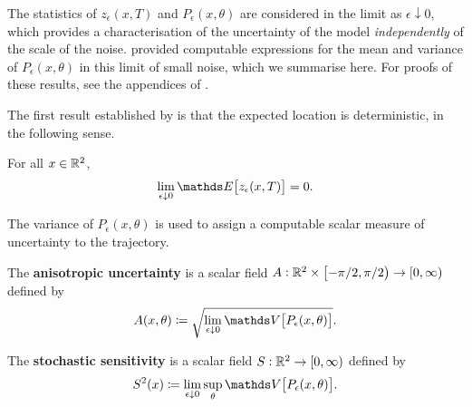 

The statistics of \(z_\epsilon\left(x,T\right)\) and \(P_\epsilon(x,\theta)\) are considered in the limit as \(\epsilon\downarrow 0\), which provides a characterisation of the uncertainty of the model \emph{independently} of the scale of the noise.
\citet{Balasuriya_2020_StochasticSensitivityComputable} provided computable expressions for the mean and variance of \(P_\epsilon\left(x,\theta\right)\) in this limit of small noise, which we summarise here.
For proofs of these results, see the appendices of \cite{Balasuriya_2020_StochasticSensitivityComputable}.

The first result established by \citet{Balasuriya_2020_StochasticSensitivityComputable} is that the expected location is deterministic, in the following sense.
\begin{theorem}
	For all \(x \in \mathbb{R}^2\),
	\[
		\lim_{\epsilon\downarrow 0}\avg{z_\epsilon(x,T)} = 0.
	\]
\end{theorem}

The variance of \(P_\epsilon\left(x,\theta\right)\) is used to assign a computable scalar measure of uncertainty to the trajectory.

\begin{definition}
	\begin{alpharate}
		\item The \textbf{anisotropic uncertainty} is a scalar field \(A: \mathbb{R}^2\times\left[-\pi/2, \pi/2\right) \to [0,\infty)\) defined by
		\[
			A(x,\theta) \coloneqq \sqrt{\lim_{\epsilon\downarrow 0}\var{P_\epsilon(x,\theta)}}.
		\]

		\item The \textbf{stochastic sensitivity} is a scalar field \(S: \mathbb{R}^2 \to [0,\infty)\) defined by
		\[
			S^2(x) \coloneqq \lim_{\epsilon\downarrow 0}\sup_{\theta}{\var{P_\epsilon(x,\theta)}}.
		\]
	\end{alpharate}
\end{definition}

